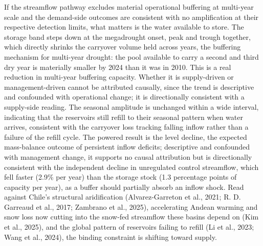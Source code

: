 \documentclass[
]{agujournal2019}
\begin{document}
If the streamflow pathway excludes material operational buffering at
multi-year scale and the demand-side outcomes are consistent with no
amplification at their respective detection limits, what matters is the
water available to store. The storage band steps down at the megadrought
onset, peak and trough together, which directly shrinks the carryover
volume held across years, the buffering mechanism for multi-year
drought: the pool available to carry a second and third dry year is
materially smaller by 2024 than it was in 2010. This is a real reduction
in multi-year buffering capacity. Whether it is supply-driven or
management-driven cannot be attributed causally, since the trend is
descriptive and confounded with operational change; it is directionally
consistent with a supply-side reading. The seasonal amplitude is
unchanged within a wide interval, indicating that the reservoirs still
refill to their seasonal pattern when water arrives, consistent with the
carryover loss tracking falling inflow rather than a failure of the
refill cycle. The powered result is the level decline, the expected
mass-balance outcome of persistent inflow deficits; descriptive and
confounded with management change, it supports no causal attribution but
is directionally consistent with the independent decline in unregulated
control streamflow, which fell faster (2.9\% per year) than the storage
stock (1.3 percentage points of capacity per year), as a buffer should
partially absorb an inflow shock. Read against Chile's structural
aridification (Alvarez-Garreton et al., 2021; R. D. Garreaud et al.,
2017; Zambrano et al., 2025), accelerating Andean warming and snow loss
now cutting into the snow-fed streamflow these basins depend on (Kim et
al., 2025), and the global pattern of reservoirs failing to refill (Li
et al., 2023; Wang et al., 2024), the binding constraint is shifting
toward supply.
\end{document}
